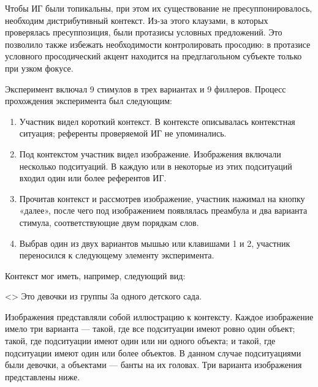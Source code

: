 \documentclass[a4paper, 12pt]{article}
\begin{document}
Чтобы ИГ были топикальны, при этом их существование не пресуппонировалось, необходим дистрибутивный контекст. Из-за этого клаузами, в которых проверялась пресуппозиция, были протазисы условных предложений. Это позволило также избежать необходимости контролировать просодию: в протазисе условного просодический акцент находится на предглагольном субъекте только при узком фокусе.

Эксперимент включал 9 стимулов в трех вариантах и 9 филлеров. Процесс прохождения эксперимента был следующим:

\begin{enumerate}
    \item Участник видел короткий контекст. В контексте описывалась контекстная ситуация; референты проверяемой ИГ не упоминались.
    \item Под контекстом участник видел изображение. Изображения включали несколько подситуаций. В каждую или в некоторые из этих подситуаций входил один или более референтов ИГ.
    \item Прочитав контекст и рассмотрев изображение, участник нажимал на кнопку «далее», после чего под изображением появлялась преамбула и два варианта стимула, соответствующие двум порядкам слов. 
    \item Выбрав один из двух вариантов мышью или клавишами 1 и 2, участник переносился к следующему элементу эксперимента.
\end{enumerate}

Контекст мог иметь, например, следующий вид:

\ex<>
        Это девочки из группы 3а одного детского сада.
\xe

Изображения представляли собой иллюстрацию к контексту. Каждое изображение имело три варианта — такой, где все подситуации имеют ровно один объект; такой, где подситуации имеют один или ни одного объекта; и такой, где подситуации имеют один или более объектов. В данном случае подситуациями были девочки, а объектами — банты на их головах. Три варианта изображения представлены ниже.
\end{document}
